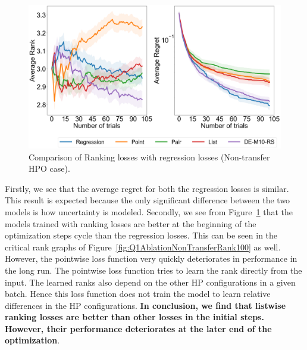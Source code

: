 \documentclass[12pt, twoside, ngerman]{report}
\begin{document}
\begin{figure}[h]
  \centering
    \includegraphics[scale=0.25]{images/Q1AblationNonTransfer}
    \caption{Comparison of Ranking losses with regression losses (Non-transfer HPO case).}
    \label{fig:Q1AblationNonTransfer}
\end{figure}

Firstly, we see that the average regret for both the regression losses is similar. This result is expected because the only significant difference between the two models is how uncertainty is modeled. Secondly,  we see from Figure~\ref{fig:Q1AblationNonTransfer} that the models trained with ranking losses are better at the beginning of the optimization steps cycle than the regression losses. This can be seen in the critical rank graphs of Figure~\ref{fig:Q1AblationNonTransferRank100} as well. However, the pointwise loss function very quickly deteriorates in performance in the long run. The pointwise loss function tries to learn the rank directly from the input. The learned ranks also depend on the other HP configurations in a given batch. Hence this loss function does not train the model to learn relative differences in the HP configurations.
\textbf{In conclusion, we find that listwise ranking losses are better than other losses in the initial steps. However, their performance deteriorates at the later end of the optimization}.
\end{document}
